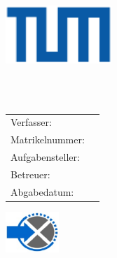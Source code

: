 \begin{titlepage}
  \centering

  \includegraphics[width=40mm]{logos/tum}

  \vspace{5mm}
  {\huge\MakeUppercase{\getUniversity{}}}\\
  
  \vspace{5mm}
  {\large\MakeUppercase{\getGroup{}}}\\

  \vspace{20mm}
  {\Large \getDoctype{}}

  \vspace{10mm}
  {\huge\bfseries \getTitleGer{}}

  \vspace{15mm}
  \begin{tabular}{l l}
    Verfasser: & \getAuthor{} \\
	Matrikelnummer: & \getMat{}  \\
    Aufgabensteller: & \getSupervisor{} \\
    Betreuer: & \getAdvisor{} \\
    Abgabedatum: & \getSubmissionDate{} \\
  \end{tabular}

  \vspace{20mm}
  \includegraphics[width=20mm]{logos/fachgebiet}
\end{titlepage}
